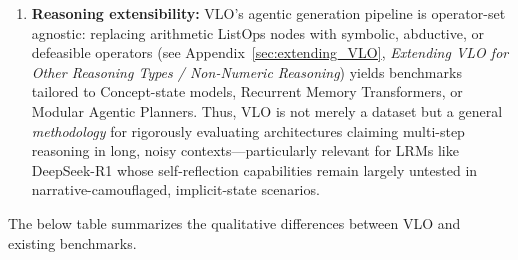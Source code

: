 \documentclass{article}
\begin{document}
\begin{enumerate}
  \item \textbf{Reasoning extensibility:}
        VLO's agentic generation pipeline is operator-set agnostic: replacing arithmetic ListOps nodes with symbolic, abductive, or defeasible operators (see Appendix~\ref{sec:extending_VLO}, \textit{Extending VLO for Other Reasoning Types / Non-Numeric Reasoning}) yields benchmarks tailored to Concept-state models, Recurrent Memory Transformers, or Modular Agentic Planners. Thus, VLO is not merely a dataset but a general \emph{methodology} for rigorously evaluating architectures claiming multi-step reasoning in long, noisy contexts—particularly relevant for LRMs like DeepSeek-R1 whose self-reflection capabilities remain largely untested in narrative-camouflaged, implicit-state scenarios.

\end{enumerate}

The below table summarizes the qualitative differences between VLO and existing benchmarks.
\end{document}

